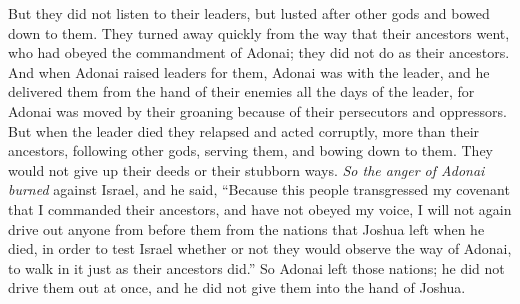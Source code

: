 \begin{biblechapter}
\verse But they did not listen to their leaders, but lusted after other gods and bowed down to them. They turned away quickly from the way that their ancestors went, who had obeyed the commandment of Adonai; they did not do as their ancestors.
\verse And when Adonai raised leaders for them, Adonai was with the leader, and he delivered them from the hand of their enemies all the days of the leader, for Adonai was moved by their groaning because of their persecutors and oppressors.
\verse But when the leader died they relapsed and acted corruptly, more than their ancestors, following other gods, serving them, and bowing down to them. They would not give up their deeds or their stubborn ways.
\verse \textit{So the anger of Adonai burned} against Israel, and he said, “Because this people transgressed my covenant that I commanded their ancestors, and have not obeyed my voice,
\verse I will not again drive out anyone from before them from the nations that Joshua left when he died,
\verse in order to test Israel whether or not they would observe the way of Adonai, to walk in it just as their ancestors did.”
\verse So Adonai left those nations; he did not drive them out at once, and he did not give them into the hand of Joshua.
\end{biblechapter}

